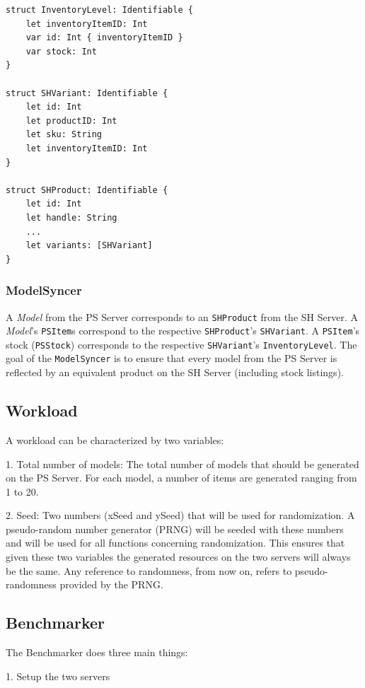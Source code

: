 \begin{verbatim}
struct InventoryLevel: Identifiable {
    let inventoryItemID: Int
    var id: Int { inventoryItemID }
    var stock: Int
}

struct SHVariant: Identifiable {
    let id: Int
    let productID: Int
    let sku: String
    let inventoryItemID: Int
}

struct SHProduct: Identifiable {
    let id: Int
    let handle: String
    ...
    let variants: [SHVariant]
}
\end{verbatim}

\subsubsection{ModelSyncer}
A \textit{Model} from the PS Server corresponds to an \texttt{SHProduct} from the SH Server. A \textit{Model}'s \texttt{PSItem}s correspond to the respective \texttt{SHProduct}'s \texttt{SHVariant}. A \texttt{PSItem}'s stock (\texttt{PSStock}) corresponds to the respective \texttt{SHVariant}'s \texttt{InventoryLevel}. The goal of the \texttt{ModelSyncer} is to ensure that every model from the PS Server is reflected by an equivalent product on the SH Server (including stock listings).

\subsection{Workload}
A workload can be characterized by two variables:

1. Total number of models: The total number of models that should be generated on the PS Server. For each model, a number of items are generated ranging from 1 to 20.

2. Seed: Two numbers (xSeed and ySeed) that will be used for randomization. A pseudo-random number generator (PRNG) will be seeded with these numbers and will be used for all functions concerning randomization. This ensures that given these two variables the generated resources on the two servers will always be the same. Any reference to randomness, from now on, refers to pseudo-randomness provided by the PRNG.

\subsection{Benchmarker}

The Benchmarker does three main things:

1. Setup the two servers


